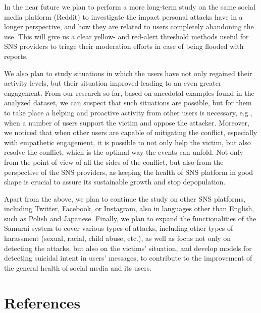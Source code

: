 \documentclass[
  10pt,
  dvipsnames]{scrartcl}
\begin{document}
In the near future we plan to perform a more long-term study on the same
social media platform (Reddit) to investigate the impact personal
attacks have in a longer perspective, and how they are related to users
completely abandoning the use. This will give us a clear yellow- and
red-alert threshold methods useful for SNS providers to triage their
moderation efforts in case of being flooded with reports.

We also plan to study situations in which the users have not only
regained their activity levels, but their situation improved leading to
an even greater engagement. From our research so far, based on anecdotal
examples found in the analyzed dataset, we can suspect that such
situations are possible, but for them to take place a helping and
proactive activity from other users is necessary, e.g., when a number of
users support the victim and oppose the attacker. Moreover, we noticed
that when other users are capable of mitigating the conflict, especially
with empathetic engagement, it is possible to not only help the victim,
but also resolve the conflict, which is the optimal way the events can
unfold. Not only from the point of view of all the sides of the
conflict, but also from the perspective of the SNS providers, as keeping
the health of SNS platform in good shape is crucial to assure its
sustainable growth and stop depopulation.

Apart from the above, we plan to continue the study on other SNS
platforms, including Twitter, Facebook, or Instagram, also in languages
other than English, such as Polish and Japanese. Finally, we plan to
expand the functionalities of the \textsf{ Samurai} system to cover
various types of attacks, including other types of harassment (sexual,
racial, child abuse, etc.), as well as focus not only on detecting the
attacks, but also on the victims' situation, and develop models for
detecting suicidal intent in users' messages, to contribute to the
improvement of the general health of social media and its users.

\newpage

\section*{References}
\end{document}
